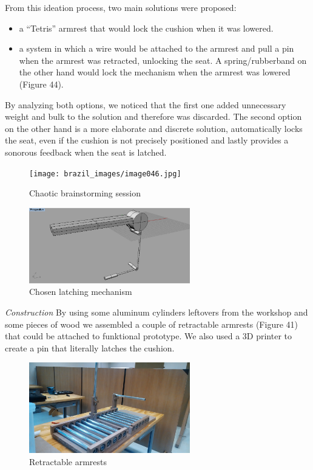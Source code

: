 From this ideation process, two main solutions were proposed:

\begin{itemize}
	\item a “Tetris” armrest that would lock the cushion when it was lowered. 
	\item a system in which a wire would be attached to the armrest and pull a pin when the armrest was retracted, unlocking the seat. A spring/rubberband on the other hand would lock the mechanism when the armrest was lowered (Figure 44).
\end{itemize}

By analyzing both options, we noticed that the first one added unnecessary weight and bulk to the solution and therefore was discarded. The second option on the other hand is a more elaborate and discrete solution, automatically locks the seat, even if the cushion is not precisely positioned and lastly provides a sonorous feedback when the seat is latched. \\

\begin{figure}[h]
\centering
\texttt{[image: brazil\_images/image046.jpg]}
\caption{Chaotic brainstorming session}
\label{fig:chaotic_brainstorming}
\end{figure}


\begin{figure}[h]
\centering
\includegraphics[width=7cm]{brazil_images/image048.png}
\caption{Chosen latching mechanism}
\label{fig:latching}
\end{figure}

\emph{Construction}
By using some aluminum cylinders leftovers from the workshop and some pieces of wood we assembled a couple of retractable armrests (Figure 41) that could be attached to funktional prototype. We also used a 3D printer to create a pin that literally latches the cushion.

\begin{figure}[h]
\centering
\includegraphics[width=7cm]{brazil_images/image049.jpg}
\caption{Retractable armrests}
\label{fig:retractable_armrest}
\end{figure}

